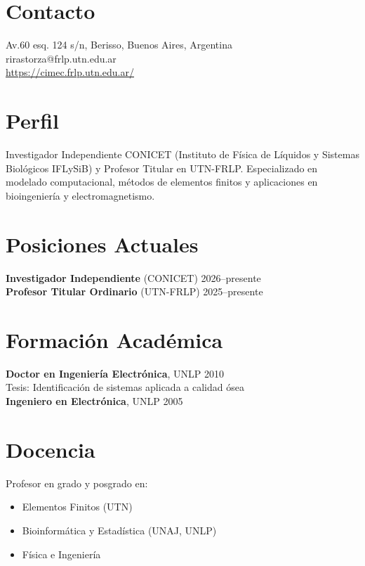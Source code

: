 \documentclass[margin,line]{res}
\begin{document}

\begin{resume}

\section{\sc Contacto}
Av.60 esq. 124 s/n, Berisso, Buenos Aires, Argentina\\
rirastorza@frlp.utn.edu.ar \\
\url{https://cimec.frlp.utn.edu.ar/}

\section{\sc Perfil}
Investigador Independiente CONICET (Instituto de Física de Líquidos y Sistemas Biológicos IFLySiB) y Profesor Titular en UTN-FRLP. Especializado en modelado computacional, métodos de elementos finitos y aplicaciones en bioingeniería y electromagnetismo.

\section{\sc Posiciones Actuales}
{\bf Investigador Independiente} (CONICET) \hfill 2026--presente\\
{\bf Profesor Titular Ordinario} (UTN-FRLP) \hfill 2025--presente

\section{\sc Formación Académica}
{\bf Doctor en Ingeniería Electrónica}, UNLP \hfill 2010\\
Tesis: Identificación de sistemas aplicada a calidad ósea\\
{\bf Ingeniero en Electrónica}, UNLP \hfill 2005

\section{\sc Docencia}
Profesor en grado y posgrado en:
\begin{itemize}
\item Elementos Finitos (UTN)
\item Bioinformática y Estadística (UNAJ, UNLP)
\item Física e Ingeniería
\end{itemize}


\end{resume}
\end{document}
